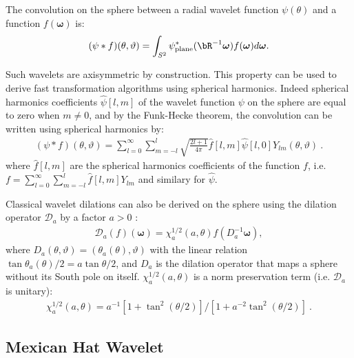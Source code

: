 The convolution on the sphere between a radial wavelet function $\psi(\theta)$ and a function $f({\boldsymbol \omega})$ is:
 \begin{eqnarray}
\label{convol_sph}
(\psi \ast f)(\theta,\vartheta)= \int_{S^2} \psi_{\mathrm{plane}}^* (\bR^{-1}  {\boldsymbol \omega}) f({\boldsymbol \omega}) d{\boldsymbol \omega} .
\end{eqnarray}

Such wavelets are axisymmetric by construction. This property can be used to derive fast transformation algorithms using spherical harmonics.
Indeed spherical harmonics coefficients $\hat{\psi}[l,m]$ of the wavelet function $\psi$ on the sphere are equal to zero when  $m \neq 0$, and by the Funk-Hecke theorem, the convolution can be written using spherical harmonics by:
\begin{eqnarray}
\label{convol_sph_harm}
(\psi \ast f)(\theta,\vartheta)  =  \sum_{l=0}^{\infty} \sum_{m=-l}^{l} \sqrt{\frac{2l+1}{4\pi} }\hat{f}[l,m] \hat{ \psi}[l,0] Y_{lm}(\theta,\vartheta) ~.
\end{eqnarray}
where $\hat{f}[l,m]$ are the spherical harmonics coefficients of the function $f$, i.e. $f = \sum_{l=0}^{\infty}\sum_{m=-l}^{l}  \hat{f}[l,m] Y_{lm}$ and similary for $\hat{\psi}$.

Classical wavelet dilations can also be derived on the sphere using the dilation operator $\mathscr{D}_a$ by a factor $a > 0$ \citep{wiaux07}:
\begin{eqnarray}
\label{proj_stereo}
\mathscr{D}_a(f)({\boldsymbol \omega}) = \chi_a^{1/2} (a,\theta)  f(D^{-1}_a {\boldsymbol \omega}) ,
\end{eqnarray}
where $D_a(\theta,\vartheta)=(\theta_a(\theta),\vartheta)$ with the linear relation $\tan\theta_a(\theta)/2=a\tan\theta/2$, and $D_a$ is the dilation operator that maps a sphere without its South pole on itself. $ \chi_a^{1/2}(a,\theta)$ is a norm preservation term (i.e. $\mathscr{D}_a$ is unitary):
\begin{eqnarray}
\label{def_lambda}
\chi_a^{1/2}(a,\theta) = a^{-1}[1+\tan^2(\theta/2)]/[1+a^{-2}\tan^2(\theta/2)] ~.
\end{eqnarray}


\subsection{Mexican Hat Wavelet} 

